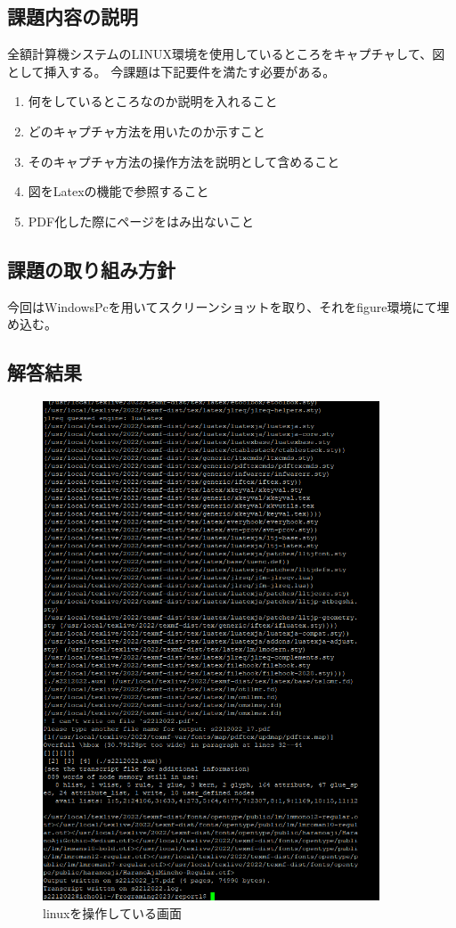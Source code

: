 \documentclass[fontsize = 14pt, paper= a4]{jlreq}
\begin{document}
\subsection{課題内容の説明}
全額計算機システムのLINUX環境を使用しているところをキャプチャして、図として挿入する。
今課題は下記要件を満たす必要がある。

\begin{enumerate}
\item 何をしているところなのか説明を入れること
\item どのキャプチャ方法を用いたのか示すこと
\item そのキャプチャ方法の操作方法を説明として含めること
\item 図をLatexの機能で参照すること
\item PDF化した際にページをはみ出ないこと
\end{enumerate}

\subsection{課題の取り組み方針}
今回はWindowsPcを用いてスクリーンショットを取り、それをfigure環境にて埋め込む。
\subsection{解答結果}

\begin{figure}[htbp]
  \centering
  \includegraphics[width=100mm]{linux.png}
  \caption{linuxを操作している画面}
  \label{fig:linux_using}
\end{figure}
\end{document}
